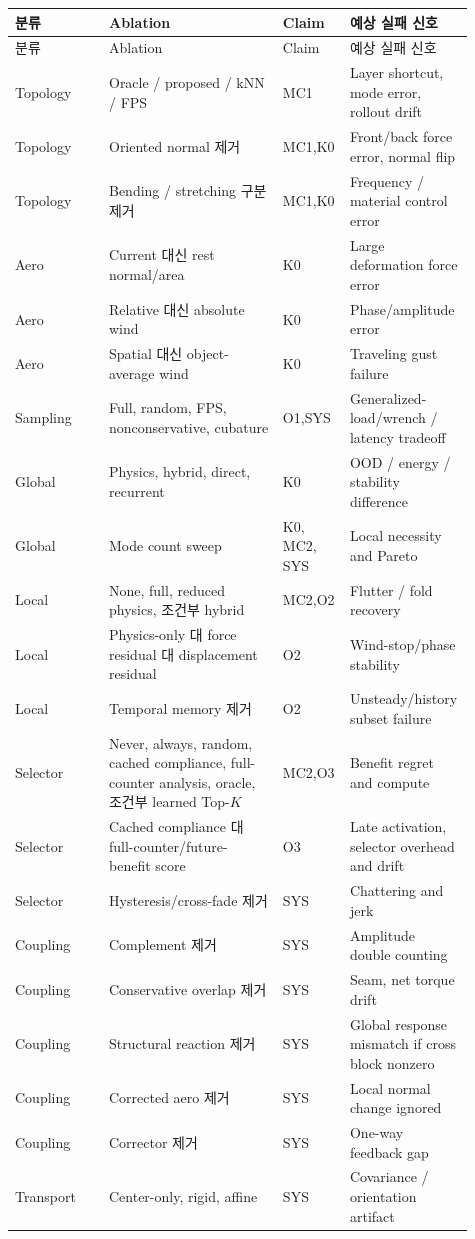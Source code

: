 \documentclass[11pt,a4paper]{article}
\begin{document}
\begin{longtable}{L{0.20\linewidth}L{0.37\linewidth}L{0.12\linewidth}L{0.22\linewidth}}
\toprule
분류 & Ablation & Claim & 예상 실패 신호 \\
\midrule
\endfirsthead
\toprule
분류 & Ablation & Claim & 예상 실패 신호 \\
\midrule
\endhead
Topology & Oracle / proposed / kNN / FPS & MC1 & Layer shortcut, mode error, rollout drift \\
\addlinespace
Topology & Oriented normal 제거 & MC1,K0 & Front/back force error, normal flip \\
\addlinespace
Topology & Bending / stretching 구분 제거 & MC1,K0 & Frequency / material control error \\
\addlinespace
Aero & Current 대신 rest normal/area & K0 & Large deformation force error \\
\addlinespace
Aero & Relative 대신 absolute wind & K0 & Phase/amplitude error \\
\addlinespace
Aero & Spatial 대신 object-average wind & K0 & Traveling gust failure \\
\addlinespace
Sampling & Full, random, FPS, nonconservative, cubature & O1,SYS & Generalized-load/wrench / latency tradeoff \\
\addlinespace
Global & Physics, hybrid, direct, recurrent & K0 & OOD / energy / stability difference \\
\addlinespace
Global & Mode count sweep & K0, MC2, SYS & Local necessity and Pareto \\
\addlinespace
Local & None, full, reduced physics, 조건부 hybrid & MC2,O2 & Flutter / fold recovery \\
\addlinespace
Local & Physics-only 대 force residual 대 displacement residual & O2 & Wind-stop/phase stability \\
\addlinespace
Local & Temporal memory 제거 & O2 & Unsteady/history subset failure \\
\addlinespace
Selector & Never, always, random, cached compliance, full-counter analysis, oracle, 조건부 learned Top-\(K\) & MC2,O3 & Benefit regret and compute \\
\addlinespace
Selector & Cached compliance 대 full-counter/future-benefit score & O3 & Late activation, selector overhead and drift \\
\addlinespace
Selector & Hysteresis/cross-fade 제거 & SYS & Chattering and jerk \\
\addlinespace
Coupling & Complement 제거 & SYS & Amplitude double counting \\
\addlinespace
Coupling & Conservative overlap 제거 & SYS & Seam, net torque drift \\
\addlinespace
Coupling & Structural reaction 제거 & SYS & Global response mismatch if cross block nonzero \\
\addlinespace
Coupling & Corrected aero 제거 & SYS & Local normal change ignored \\
\addlinespace
Coupling & Corrector 제거 & SYS & One-way feedback gap \\
\addlinespace
Transport & Center-only, rigid, affine & SYS & Covariance / orientation artifact \\
\bottomrule
\end{longtable}
\end{document}
